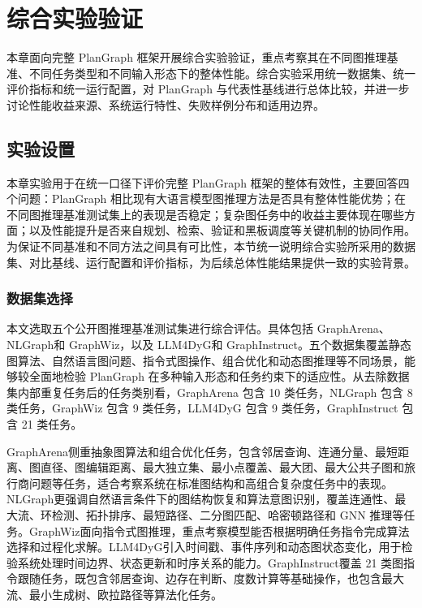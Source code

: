 \chapter{综合实验验证}
\label{chp:experiment}

本章面向完整 PlanGraph 框架开展综合实验验证，重点考察其在不同图推理基准、不同任务类型和不同输入形态下的整体性能。综合实验采用统一数据集、统一评价指标和统一运行配置，对 PlanGraph 与代表性基线进行总体比较，并进一步讨论性能收益来源、系统运行特性、失败样例分布和适用边界。

\section{实验设置}

本章实验用于在统一口径下评价完整 PlanGraph 框架的整体有效性，主要回答四个问题：PlanGraph 相比现有大语言模型图推理方法是否具有整体性能优势；在不同图推理基准测试集上的表现是否稳定；复杂图任务中的收益主要体现在哪些方面；以及性能提升是否来自规划、检索、验证和黑板调度等关键机制的协同作用。为保证不同基准和不同方法之间具有可比性，本节统一说明综合实验所采用的数据集、对比基线、运行配置和评价指标，为后续总体性能结果提供一致的实验背景。

\subsection{数据集选择}

本文选取五个公开图推理基准测试集进行综合评估。具体包括 GraphArena\cite{tang2025grapharena}、NLGraph\cite{chen2024nlgraph}和 GraphWiz\cite{gong2024graphwiz}，以及 LLM4DyG\cite{llm4dyg2024}和 GraphInstruct\cite{graphinstruct2024}。五个数据集覆盖静态图算法、自然语言图问题、指令式图操作、组合优化和动态图推理等不同场景，能够较全面地检验 PlanGraph 在多种输入形态和任务约束下的适应性。从去除数据集内部重复任务后的任务类别看，GraphArena 包含 10 类任务，NLGraph 包含 8 类任务，GraphWiz 包含 9 类任务，LLM4DyG 包含 9 类任务，GraphInstruct 包含 21 类任务。

GraphArena\cite{tang2025grapharena}侧重抽象图算法和组合优化任务，包含邻居查询、连通分量、最短距离、图直径、图编辑距离、最大独立集、最小点覆盖、最大团、最大公共子图和旅行商问题等任务，适合考察系统在标准图结构和高组合复杂度任务中的表现。NLGraph\cite{chen2024nlgraph}更强调自然语言条件下的图结构恢复和算法意图识别，覆盖连通性、最大流、环检测、拓扑排序、最短路径、二分图匹配、哈密顿路径和 GNN 推理等任务。GraphWiz\cite{gong2024graphwiz}面向指令式图推理，重点考察模型能否根据明确任务指令完成算法选择和过程化求解。LLM4DyG\cite{llm4dyg2024}引入时间戳、事件序列和动态图状态变化，用于检验系统处理时间边界、状态更新和时序关系的能力。GraphInstruct\cite{graphinstruct2024}覆盖 21 类图指令跟随任务，既包含邻居查询、边存在判断、度数计算等基础操作，也包含最大流、最小生成树、欧拉路径等算法化任务。

